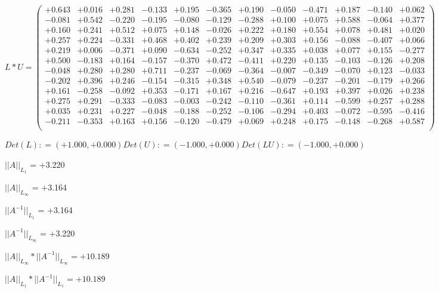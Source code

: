 \documentclass[9pt]{article}
\theoremstyle{plain}
\theoremstyle{definition}
\theoremstyle{remark}
\numberwithin{equation}{section}
\begin{document}
$L * U  = \left(
\begin{array}{
cccccccccccc}
+0.643 & +0.016 & +0.281 & -0.133 & +0.195 & -0.365 & +0.190 & -0.050 & -0.471 & +0.187 & -0.140 & +0.062 \\
-0.081 & +0.542 & -0.220 & -0.195 & -0.080 & -0.129 & -0.288 & +0.100 & +0.075 & +0.588 & -0.064 & +0.377 \\
+0.160 & +0.241 & +0.512 & +0.075 & +0.148 & -0.026 & +0.222 & +0.180 & +0.554 & +0.078 & +0.481 & +0.020 \\
+0.257 & +0.224 & -0.331 & +0.468 & +0.402 & +0.239 & +0.209 & +0.303 & +0.156 & -0.088 & -0.407 & +0.066 \\
+0.219 & +0.006 & -0.371 & +0.090 & -0.634 & -0.252 & +0.347 & +0.335 & +0.038 & +0.077 & +0.155 & -0.277 \\
+0.500 & -0.183 & +0.164 & -0.157 & -0.370 & +0.472 & -0.411 & +0.220 & +0.135 & -0.103 & -0.126 & +0.208 \\
-0.048 & +0.280 & +0.280 & +0.711 & -0.237 & -0.069 & -0.364 & -0.007 & -0.349 & -0.070 & +0.123 & -0.033 \\
-0.202 & +0.396 & +0.246 & -0.154 & -0.315 & +0.348 & +0.540 & -0.079 & -0.237 & -0.201 & -0.179 & +0.266 \\
+0.161 & -0.258 & -0.092 & +0.353 & -0.171 & +0.167 & +0.216 & -0.647 & +0.193 & +0.397 & +0.026 & +0.238 \\
+0.275 & +0.291 & -0.333 & -0.083 & -0.003 & -0.242 & -0.110 & -0.361 & +0.114 & -0.599 & +0.257 & +0.288 \\
+0.035 & +0.231 & +0.227 & -0.048 & -0.188 & -0.252 & -0.106 & -0.294 & +0.403 & -0.072 & -0.595 & -0.416 \\
-0.211 & -0.353 & +0.163 & +0.156 & -0.120 & -0.479 & +0.069 & +0.248 & +0.175 & -0.148 & -0.268 & +0.587 \\
\end{array}
\right)$ \newline 

$Det(L) :    = (+1.000,+0.000)     Det(U) :    = (-1.000,+0.000)     Det(LU) :    = (-1.000,+0.000)$

$||A||_{L_1}$  = +3.220

$||A||_{L_{\infty}}$ = +3.164

$||A^{-1}||_{L_1}$  = +3.164

$||A^{-1}||_{L_{\infty}}$ = +3.220

$||A||_{L_{\infty}} * ||A^{-1}||_{L_{\infty}} = +10.189$

$||A||_{L_1} * ||A^{-1}||_{L_1} = +10.189$
\end{document}
